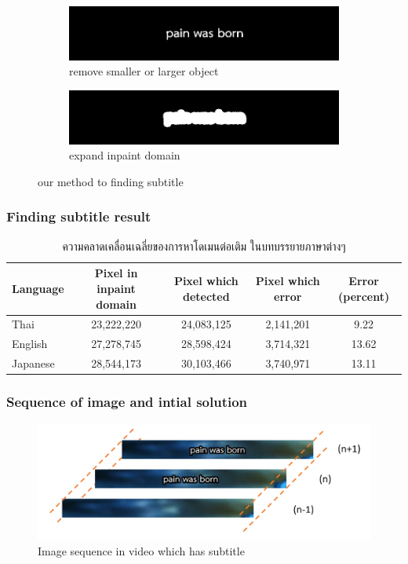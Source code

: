 \documentclass[xcolor=dvipsnames, xetex,serif]{beamer}
\begin{document}
\begin{frame}
\begin{figure}[H]
\begin{subfigure}{0.4\linewidth}
                \centering
                \includegraphics[width=0.8\linewidth]{images/subtitle_detection/detection-erode-opening.png}
                \caption{remove smaller or larger object}
            \end{subfigure}
            \begin{subfigure}{0.4\linewidth}
                \centering
                \includegraphics[width=0.8\linewidth]{images/subtitle_detection/detection-stoke.png}
                \caption{expand inpaint domain}
            \end{subfigure}
            \caption{our method to finding subtitle}
        \end{figure}
    \end{frame}
    \begin{frame}
        \frametitle{Finding subtitle result}
        \begin{table}[H]
            \centering
            \footnotesize
            \begin{tabular}[ht]{|l|c|c|c|c|}
                \hline
                Language  & Pixel in inpaint domain & Pixel which detected & Pixel which error & Error (percent) \\
                \hline
                Thai & 23,222,220 & 24,083,125 & 2,141,201 & 9.22 \\
                English & 27,278,745 & 28,598,424 & 3,714,321 & 13.62 \\
                Japanese & 28,544,173 & 30,103,466 & 3,740,971 & 13.11 \\
                \hline
            \end{tabular}
            \caption{ความคลาดเคลื่อนเฉลี่ยของการหาโดเมนต่อเติม ในบทบรรยายภาษาต่างๆ}
        \end{table}	
    \end{frame}
    \begin{frame}
        \frametitle{Sequence of image and intial solution}
        \begin{figure}[H]
            \centering
            \includegraphics[width=0.8\linewidth]{images/skipborrow/frame_sequence.png}
            \caption{Image sequence in video which has subtitle}
        \end{figure}
    \end{frame}
\end{document}
